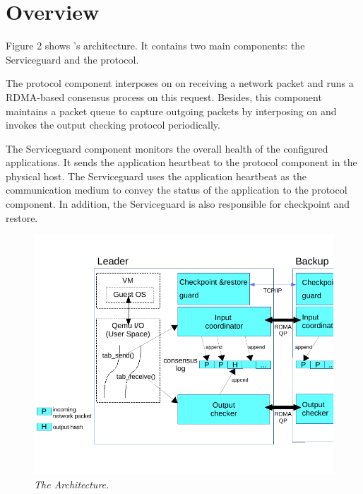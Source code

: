 \section{\xxx Overview} \label{sec:overview}

Figure 2 shows \xxx's architecture. It contains two main components: 
the Serviceguard and the protocol. 

The protocol component interposes on \tapsend on receiving a network packet 
and runs a RDMA-based consensus process on this request. Besides, this component 
maintains a packet queue to capture outgoing packets by interposing on 
\taprecv and invokes the output checking protocol periodically. 

The Serviceguard component monitors the overall health of the configured applications. 
It sends the application heartbeat to the protocol component in the physical 
host. The Serviceguard uses the application heartbeat as the communication 
medium to convey the status of the application to the protocol component. 
In addition, the Serviceguard is also responsible for checkpoint and restore. 


\begin{figure}[t]
\centering
\includegraphics[width=.47\textwidth]{figures/arch}
\vspace{-.2in}
\caption{{\em The \xxx Architecture.}} \label{fig:arc}
\vspace{.05in}
\end{figure}
